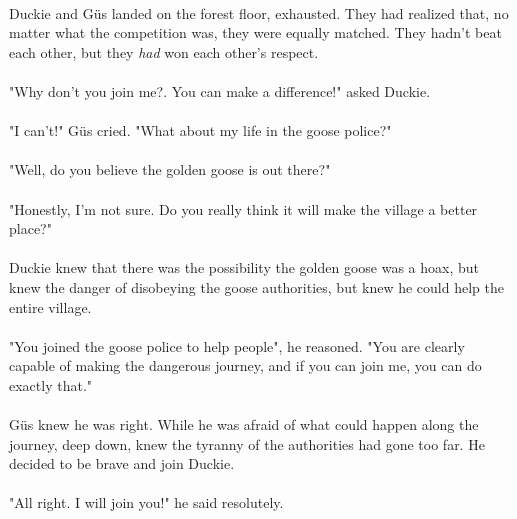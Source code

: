 \paragraph{} Duckie and G{\"u}s landed on the forest floor, exhausted. They had realized that, no matter what the competition was, they were equally matched. They hadn't beat each other, but they \textit{had} won each other's respect. 
\paragraph{} "Why don't you join me?. You can make a difference!" asked Duckie.
\paragraph{} "I can't!" G{\"u}s cried. "What about my life in the goose police?"
\paragraph{} "Well, do you believe the golden goose is out there?"
\paragraph{} "Honestly, I'm not sure. Do you really think it will make the village a better place?"
\paragraph{} Duckie knew that there was the possibility the golden goose was a hoax, but knew the danger of disobeying the goose authorities, but knew he could help the entire village. 
\paragraph{} "You joined the goose police to help people", he reasoned. "You are clearly capable of making the dangerous journey, and if you can join me, you can do exactly that."
\paragraph{} G{\"u}s knew he was right. While he was afraid of what could happen along the journey, deep down, knew the tyranny of the authorities had gone too far. He decided to be brave and join Duckie. 
\paragraph{} "All right. I will join you!" he said resolutely. 